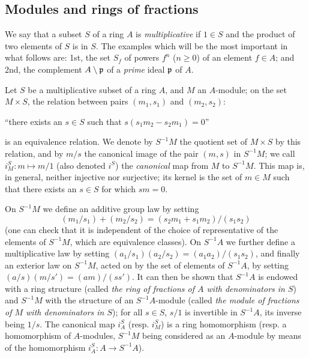 \subsection{Modules and rings of fractions}
\label{subsection-modules-and-rings-of-fractions}

\begin{env}[1.2.1]
\label{0.1.2.1}
We say that a subset $S$ of a ring $A$ is {\em multiplicative} if $1\in S$ and the product of two elements of $S$ is in $S$.
The examples which will be the
most important in what follows are: 1st, the set $S_f$ of
powers $f^n$ ($n\geqslant 0$) of an element $f\in A$; and 2nd, the
complement $A\setminus\mathfrak{p}$ of a {\em prime} ideal $\mathfrak{p}$ of $A$.
\end{env}

\begin{env}[1.2.2]
\label{0.1.2.2}
Let $S$ be a multiplicative subset of a ring $A$, and $M$ an $A$-module; on the set
$M\times S$, the relation between pairs $(m_1,s_1)$ and $(m_2,s_2)$:
\begin{center}
  ``there exists an $s\in S$ such that $s(s_1 m_2-s_2 m_1)=0$''
\end{center}
is an equivalence relation. We denote by $S^{-1}M$ the quotient set of
$M\times S$ by this relation, and by $m/s$ the canonical image of the pair $(m,s)$ in $S^{-1}M$; we call $i_M^S:m\mapsto m/1$ (also denoted $i^S$) the
{\em canonical} map from $M$ to $S^{-1}M$. This map is, in general, neither
injective nor surjective; its kernel is the set of $m\in M$ such that there
exists an $s\in S$ for which $sm=0$.

On $S^{-1}M$ we define an additive group law by setting
\[
  (m_1/s_1)+(m_2/s_2)=(s_2 m_1+s_1 m_2)/(s_1 s_2)
\]
(one can check that it is independent of the choice of representative of the elements of $S^{-1}M$, which are equivalence classes).
On $S^{-1}A$ we further define a multiplicative law by setting
$(a_1/s_1)(a_2/s_2)=(a_1 a_2)/(s_1 s_2)$, and finally an exterior law on
$S^{-1}M$, acted on by the set of elements of $S^{-1}A$, by setting
$(a/s)(m/s')=(am)/(ss')$. It can then be shown that $S^{-1}A$ is endowed with a
ring structure (called {\em the ring of fractions of $A$ with denominators in
$S$}) and $S^{-1}M$ with the structure of an $S^{-1}A$-module (called {\em the
module of fractions of $M$ with denominators in $S$}); for all $s\in S$, $s/1$
is invertible in $S^{-1}A$, its inverse being $1/s$. The canonical map $i_A^S$
(resp. $i_M^S$) is a ring homomorphism (resp. a homomorphism of $A$-modules,
$S^{-1}M$ being considered as an $A$-module by means of the homomorphism
$i_A^S:A\to S^{-1}A$).
\end{env}

